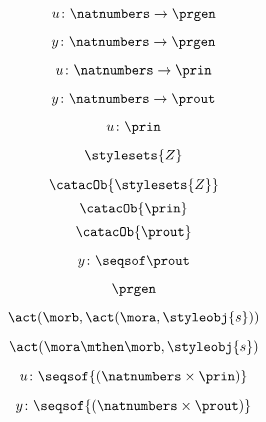 {\begin{forslides}
  \begin{equation}\label{eq:prgen-u}
    u\colon \natnumbers \to \prgen
  \end{equation}
  
  \begin{equation}\label{eq:prgen-y}
    y\colon \natnumbers \to \prgen
  \end{equation}
  
  
  \begin{equation}\label{eq:prgen-u-1}
    u\colon \natnumbers \to \prin
  \end{equation}
  
  \begin{equation}\label{eq:prgen-y-1}
    y\colon \natnumbers \to \prout
  \end{equation}
  
  \begin{equation}\label{eq:prgen-u-2}
    u\colon \prin
  \end{equation}
  
  
  
  \begin{equation}\label{eq:Z}
    \stylesets{Z}
  \end{equation}
  
  
  \begin{equation}\label{eq:Za}
    \catacOb{\stylesets{Z}}
  \end{equation}
  \begin{equation}\label{eq:Ua}
    \catacOb{\prin}
  \end{equation}
  \begin{equation}\label{eq:Ya}
    \catacOb{\prout}
  \end{equation}
  
  
  
  \begin{equation}\label{eq:prgen-y-2}
    y\colon \seqsof  \prout
  \end{equation}
  
  \begin{equation}\label{eq:prgen}
    \prgen
  \end{equation}

  \begin{equation}\label{eq:now1}
    \act(\morb, \act(\mora, \styleobj{s}))
  \end{equation}
  
  
  \begin{equation}\label{eq:now2}
    \act(\mora\mthen\morb, \styleobj{s})
  \end{equation}

  \begin{equation}\label{eq:ev-sign}
    u\colon \seqsof{(\natnumbers \times \prin)}
\end{equation}

  \begin{equation}\label{eq:ev-sign2}
    y\colon \seqsof{(\natnumbers \times \prout)}
\end{equation}
  
\end{forslides}}
